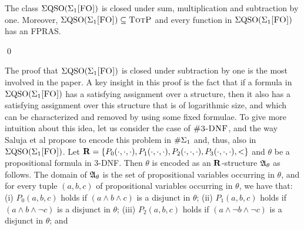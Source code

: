 \begin{thm}\label{sigmafo-minusone}
The class $\Sigma{\rm QSO}(\Sigma_{1}\textsc{[FO]})$ is closed under sum, multiplication and subtraction by one. Moreover, $\Sigma{\rm QSO}(\Sigma_{1}\textsc{[FO]}) \subseteq \text{\sc TotP}$ and every function in $\Sigma{\rm QSO}(\Sigma_{1}\textsc{[FO]})$ has an FPRAS.
\end{thm}
\begin{leftbar}
\proof

\qed
\end{leftbar}
%
%
%
The proof that $\Sigma{\rm QSO}(\Sigma_{1}\textsc{[FO]})$ is closed under subtraction by one is the most involved in the paper.
A key insight in this proof is the fact that if a formula in $\Sigma{\rm QSO}(\Sigma_{1}\textsc{[FO]})$ has a satisfying assignment over a structure, then it also has a satisfying assignment over this structure that is of logarithmic size, and which can be characterized and removed by using some fixed formulae. To give more intuition about this idea, let us consider the case of $\ctdnf$, and the way Saluja et al \cite{SalujaST95}  propose to encode this problem in $\#\Sigma_{1}$ and, thus, also in $\Sigma{\rm QSO}(\Sigma_{1}\textsc{[FO]})$. Let $\mathbf{R} = \{P_0(\cdot,\cdot,\cdot), P_1(\cdot,\cdot,\cdot), P_2(\cdot,\cdot,\cdot), P_3(\cdot,\cdot,\cdot),<\}$ and $\theta$ be a propositional formula in 3-DNF. Then $\theta$ is encoded as an $\mathbf{R}$-structure $\mathfrak{A}_\theta$ as follows. The domain of $\mathfrak{A}_\theta$ is the set of propositional variables occurring in $\theta$, and for every tuple $(a,b,c)$ of propositional variables occurring in $\theta$, we have that: (i) $P_0(a,b,c)$ holds if $(a\wedge b \wedge c)$ is a disjunct in $\theta$;
(ii) $P_1(a,b,c)$ holds if $(a\wedge b \wedge \neg c)$ is a disjunct in $\theta$;
(iii) $P_2(a,b,c)$ holds if $(a\wedge \neg b \wedge \neg c)$ is a disjunct in $\theta$; and 
